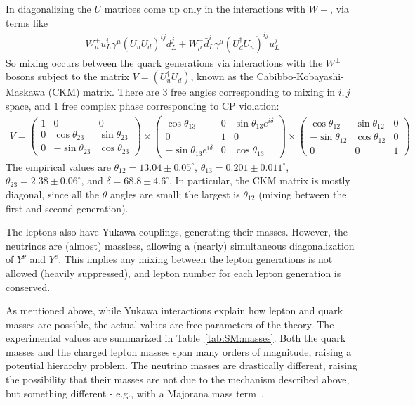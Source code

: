 In diagonalizing the $U$ matrices come up only in the interactions with $W\pm$, via terms like
\begin{align}
  W^+_\mu\bar{u}_L^i\gamma^\mu\left(U_u^\dagger U_d\right)^{ij} d_L^j + W^-_\mu\bar{d}_L^i\gamma^\mu\left(U_d^\dagger U_u\right)^{ij} u_L^j
\end{align}
So mixing occurs between the quark generations via interactions with the $W^\pm$ bosons subject to the matrix $V=\left(U_u^\dagger U_d\right)$, known as the Cabibbo-Kobayashi-Maskawa (CKM) matrix.
There are $3$ free angles corresponding to mixing in $i,j$ space, and $1$ free complex phase corresponding to CP violation:
\begin{align}
V = \begin{pmatrix} 1 & 0 & 0 \\ 0 & \cos\theta_{23} & \sin\theta_{23} \\ 0 & -\sin\theta_{23} & \cos\theta_{23} \end{pmatrix}\times
\begin{pmatrix} \cos\theta_{13} & 0 & \sin\theta_{13}e^{i\delta} \\ 0 & 1 & 0 \\-\sin\theta_{13}e^{i\delta} & 0 & \cos\theta_{13} \end{pmatrix}\times
\begin{pmatrix} \cos\theta_{12} & \sin\theta_{12} & 0 \\ -\sin\theta_{12} & \cos\theta_{12} & 0 \\ 0 & 0 & 1 \end{pmatrix}
\end{align}
The empirical values are $\theta_{12}=13.04\pm0.05^\circ$, $\theta_{13}=0.201\pm0.011^\circ$, $\theta_{23}=2.38\pm0.06^\circ$, and $\delta=68.8\pm4.6^\circ$.
In particular, the CKM matrix is mostly diagonal, since all the $\theta$ angles are small; the largest is $\theta_{12}$ (mixing between the first and second generation).

The leptons also have Yukawa couplings, generating their masses.
However, the neutrinos are (almost) massless, allowing a (nearly) simultaneous diagonalization of $Y^\nu$ and $Y^e$.
This implies any mixing between the lepton generations is not allowed (heavily suppressed), and lepton number for each lepton generation is conserved.

As mentioned above, while Yukawa interactions explain how lepton and quark masses are possible, the actual values are free parameters of the theory.
The experimental values are summarized in Table~\ref{tab:SM:masses}.
Both the quark masses and the charged lepton masses span many orders of magnitude, raising a potential hierarchy problem.
The neutrino masses are drastically different, raising the possibility that their masses are not due to the mechanism described above, but something different - e.g., with a Majorana mass term~\cite{ref:TODO}.

